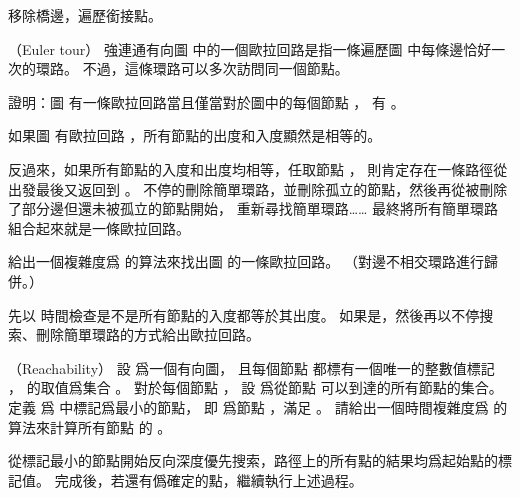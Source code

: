 \startANSWER
移除橋邊，遍歷銜接點。
\stopANSWER

\stopPROBLEM

\startPROBLEM
（Euler tour）
強連通有向圖  中的一個歐拉回路是指一條遍歷圖  中每條邊恰好一次的環路。
不過，這條環路可以多次訪問同一個節點。

\startigBase[a]\startitem
證明：圖  有一條歐拉回路當且僅當對於圖中的每個節點 ，
有 。
\stopitem\stopigBase

\startANSWER
如果圖  有歐拉回路 ，所有節點的出度和入度顯然是相等的。

反過來，如果所有節點的入度和出度均相等，任取節點 ，
則肯定存在一條路徑從  出發最後又返回到 。
不停的刪除簡單環路，並刪除孤立的節點，然後再從被刪除了部分邊但還未被孤立的節點開始，
重新尋找簡單環路……
最終將所有簡單環路組合起來就是一條歐拉回路。
\stopANSWER

\startigBase[continue]\startitem
給出一個複雜度爲  的算法來找出圖  的一條歐拉回路。
（\hint 對邊不相交環路進行歸併。）
\stopitem\stopigBase

\startANSWER
先以  時間檢查是不是所有節點的入度都等於其出度。
如果是，然後再以不停搜索、刪除簡單環路的方式給出歐拉回路。
\stopANSWER

\stopPROBLEM

\startPROBLEM
（Reachability）
設  爲一個有向圖，
且每個節點  都標有一個唯一的整數值標記 ，
  的取值爲集合 。
對於每個節點 ，
設  爲從節點  可以到達的所有節點的集合。
定義  爲  中標記爲最小的節點，
即  爲節點 ，滿足 。
請給出一個時間複雜度爲  的算法來計算所有節點  的 。
\stopPROBLEM

\startANSWER
從標記最小的節點開始反向深度優先搜索，路徑上的所有點的結果均爲起始點的標記值。
完成後，若還有僞確定的點，繼續執行上述過程。
\stopANSWER

\stopsubject%

